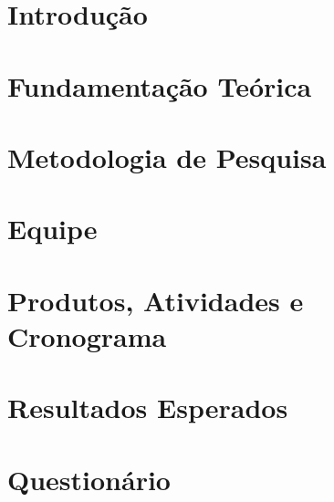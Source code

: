 \section{Introdução} %
\label{sec:introdu_o}
 

\section{Fundamentação Teórica} %
\label{sec:fundamentacao}
 

\section{Metodologia de Pesquisa} %
\label{sec:metodologia}
 

\section{Equipe} %
\label{sec:equipe}
 

\section{Produtos, Atividades e Cronograma} %
\label{sec:produtos}
 

\section{Resultados Esperados} %
\label{sec:resultados_esperados}
 

\section{Questionário} %
\label{sec:questionario}
 
